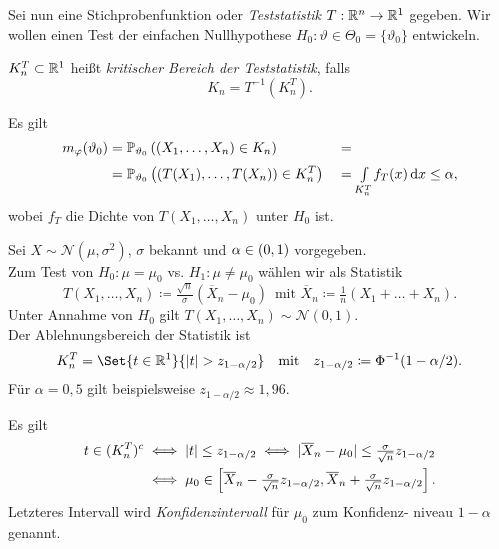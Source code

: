 \documentclass{cheat-sheet}
\renewcommand{\P}{\mathbb{P}} %
\newcommand{\Normal}{\mathcal{N}} %
\begin{document}
\begin{situation}
  Sei nun eine Stichprobenfunktion oder \emph{Teststatistik} $T : \mathbb{R}^n \to \mathbb{R}^1$ gegeben.
  Wir wollen einen Test der einfachen Nullhypothese $H_0 : \vartheta \in \Theta_0 = \{ \vartheta_0 \}$ entwickeln.
\end{situation}

\begin{defn}
  $K_n^T \subset \mathbb{R}^1$ heißt \emph{kritischer Bereich der Teststatistik}, falls
  \[ K_n = T^{-1}(K_n^T). \]
\end{defn}

\begin{bem}
  Es gilt
  \begin{alignat*}{4}
    m_\varphi(\vartheta_0) &= \P_{\vartheta_0} \left( (X_1, \ldots, X_n) \in K_n \right)
    &&= \\
    &= \P_{\vartheta_0} \left( (T(X_1), \ldots, T(X_n)) \in K_n^T \right)
    &&= \Int{K_n^T}{}{f_T(x)}{x} \leq \alpha,
  \end{alignat*}
  wobei $f_T$ die Dichte von $T(X_1, \ldots, X_n)$ unter $H_0$ ist.
\end{bem}

\begin{bsp}
  Sei $X \sim \Normal(\mu, \sigma^2)$, $\sigma$ bekannt und $\alpha \in \left( 0, 1 \right)$ vorgegeben. \\
  Zum Test von $H_0 : \mu = \mu_0$ vs. $H_1 : \mu \neq \mu_0$ wählen wir als Statistik
  \[
    T(X_1, \ldots, X_n) \coloneqq \tfrac{\sqrt{n}}{\sigma} \left( \overline{X}_n - \mu_0 \right) \enspace
    \text{mit }
    \overline{X}_n \coloneqq \tfrac{1}{n} \left( X_1 + \ldots + X_n \right).
  \]
  Unter Annahme von $H_0$ gilt $T(X_1, \ldots, X_n) \sim \Normal(0,1)$. \\
  Der Ablehnungsbereich der Statistik ist
  \[
    K_n^T = \Set{t \in \R^1}{\abs{t} > z_{1 - \alpha/2}}
    \quad \text{mit} \quad
    z_{1 - \alpha/2} \coloneqq \Phi^{-1}(1 - \alpha/2).
  \]
  Für $\alpha = 0,5$ gilt beispielsweise $z_{1 - \alpha/2} \approx 1,96$.
\end{bsp}


\begin{bem}
  Es gilt
  \begin{align*}
    t \in (K_n^T)^c
    &\iff \lvert t\rvert \leq z_{1-\alpha/2}
    \iff \lvert\overline{X}_n - \mu_0\rvert \leq \tfrac{\sigma}{\sqrt{n}} z_{1-\alpha/2} \\
    &\iff \mu_0 \in \left[ \overline{X}_n - \tfrac{\sigma}{\sqrt{n}} z_{1-\alpha/2}, \overline{X}_n + \tfrac{\sigma}{\sqrt{n}} z_{1-\alpha/2} \right].
  \end{align*}
  Letzteres Intervall wird \emph{Konfidenzintervall} für $\mu_0$ zum Konfidenz- niveau $1-\alpha$ genannt.
\end{bem}
\end{document}
